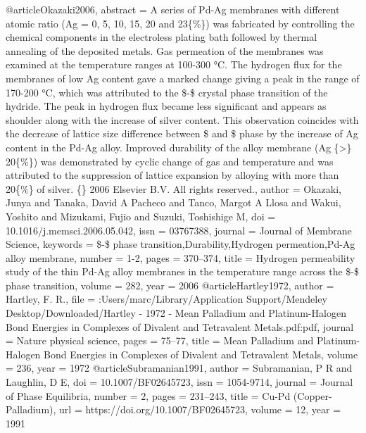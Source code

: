 @article{Okazaki2006,
abstract = {A series of Pd-Ag membranes with different atomic ratio (Ag = 0, 5, 10, 15, 20 and 23{\{}{\%}{\}}) was fabricated by controlling the chemical components in the electroless plating bath followed by thermal annealing of the deposited metals. Gas permeation of the membranes was examined at the temperature ranges at 100-300 °C. The hydrogen flux for the membranes of low Ag content gave a marked change giving a peak in the range of 170-200 °C, which was attributed to the {\$}\alpha{\$}-{\$}\beta{\$} crystal phase transition of the hydride. The peak in hydrogen flux became less significant and appears as shoulder along with the increase of silver content. This observation coincides with the decrease of lattice size difference between {\$}\alpha{\$} and {\$}\beta{\$} phase by the increase of Ag content in the Pd-Ag alloy. Improved durability of the alloy membrane (Ag {\{}{\textgreater}{\}} 20{\{}{\%}{\}}) was demonstrated by cyclic change of gas and temperature and was attributed to the suppression of lattice expansion by alloying with more than 20{\{}{\%}{\}} of silver. {\{}{\textcopyright}{\}} 2006 Elsevier B.V. All rights reserved.},
author = {Okazaki, Junya and Tanaka, David A Pacheco and Tanco, Margot A Llosa and Wakui, Yoshito and Mizukami, Fujio and Suzuki, Toshishige M},
doi = {10.1016/j.memsci.2006.05.042},
issn = {03767388},
journal = {Journal of Membrane Science},
keywords = {{\$}\alpha{\$}-{\$}\beta{\$} phase transition,Durability,Hydrogen permeation,Pd-Ag alloy membrane},
number = {1-2},
pages = {370--374},
title = {{Hydrogen permeability study of the thin Pd-Ag alloy membranes in the temperature range across the {\$}\alpha{\$}-{\$}\beta{\$} phase transition}},
volume = {282},
year = {2006}
}
@article{Hartley1972,
author = {Hartley, F. R.},
file = {:Users/marc/Library/Application Support/Mendeley Desktop/Downloaded/Hartley - 1972 - Mean Palladium and Platinum-Halogen Bond Energies in Complexes of Divalent and Tetravalent Metals.pdf:pdf},
journal = {Nature physical science},
pages = {75--77},
title = {{Mean Palladium and Platinum-Halogen Bond Energies in Complexes of Divalent and Tetravalent Metals}},
volume = {236},
year = {1972}
}
@article{Subramanian1991,
author = {Subramanian, P R and Laughlin, D E},
doi = {10.1007/BF02645723},
issn = {1054-9714},
journal = {Journal of Phase Equilibria},
number = {2},
pages = {231--243},
title = {{Cu-Pd (Copper-Palladium)}},
url = {https://doi.org/10.1007/BF02645723},
volume = {12},
year = {1991}
}
